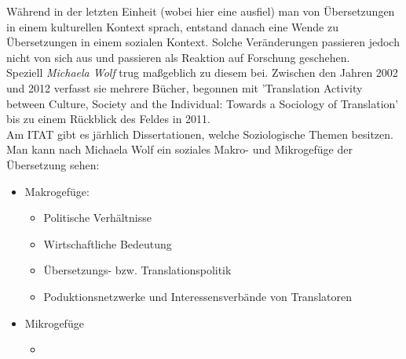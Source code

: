\documentclass{article}
\begin{document}
	Während in der letzten Einheit (wobei hier eine ausfiel) man von Übersetzungen in einem kulturellen Kontext sprach, entstand danach eine Wende zu Übersetzungen in einem sozialen Kontext. Solche Veränderungen passieren jedoch nicht von sich aus und passieren als Reaktion auf Forschung geschehen. \\
	Speziell \textit{Michaela Wolf} trug maßgeblich zu diesem bei. Zwischen den Jahren 2002 und 2012 verfasst sie mehrere Bücher, begonnen mit 'Translation Activity between Culture, Society and the Individual: Towards a Sociology of Translation' bis zu einem Rückblick des Feldes in 2011. \\
	Am ITAT gibt es järhlich Dissertationen, welche Soziologische Themen besitzen. Man kann nach Michaela Wolf ein soziales Makro- und Mikrogefüge der Übersetzung sehen:
	\begin{itemize}
		\item{Makrogefüge:}
		\begin{itemize}
			\item{Politische Verhältnisse}
			\item{Wirtschaftliche Bedeutung}
			\item{Übersetzungs- bzw. Translationspolitik}
			\item{Poduktionsnetzwerke und Interessensverbände von Translatoren}
		\end{itemize}
		\item{Mikrogefüge}
		\begin{itemize}
			\item{}
		\end{itemize}

	\end{itemize}
\end{document}

